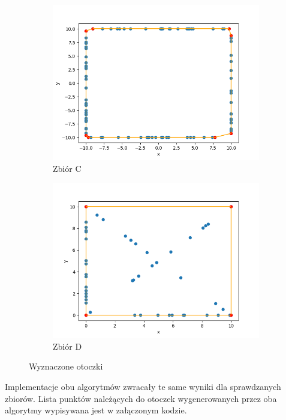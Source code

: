 \documentclass[11pt,a4paper]{article}
\begin{document}
\begin{figure}[H]
\begin{subfigure}[b]{0.46\textwidth}
        \includegraphics[scale=0.5]{res/graham_c.png}
        \caption{
            Zbiór C
        }
    \end{subfigure}
    \begin{subfigure}[b]{0.46\textwidth}
        \centering
        \includegraphics[scale=0.5]{res/graham_d.png}
        \caption{
            Zbiór D
        }
    \end{subfigure}
    \caption{Wyznaczone otoczki}
\end{figure}

Implementacje obu algorytmów zwracały te same wyniki dla sprawdzanych
zbiorów. Lista punktów należących do otoczek wygenerowanych przez oba 
algorytmy wypisywana jest w załączonym kodzie.
\end{document}
